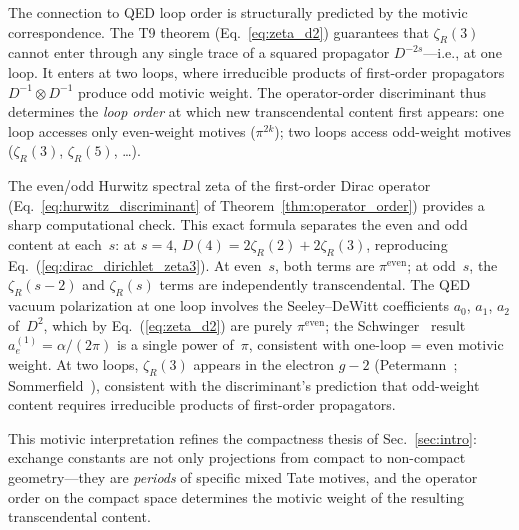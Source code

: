 \documentclass[aps,pra,twocolumn,superscriptaddress,longbibliography]{revtex4-2}
\begin{document}
The connection to QED loop order is structurally predicted by the
motivic correspondence.  The T9 theorem
(Eq.~\ref{eq:zeta_d2}) guarantees that $\zeta_R(3)$ cannot enter through
any single trace of a squared propagator $D^{-2s}$---i.e., at one loop.
It enters at two loops, where irreducible products of first-order
propagators $D^{-1} \otimes D^{-1}$ produce odd motivic weight.  The
operator-order discriminant thus determines the \emph{loop order} at
which new transcendental content first appears: one loop accesses only
even-weight motives ($\pi^{2k}$); two loops access odd-weight motives
($\zeta_R(3)$, $\zeta_R(5)$, \ldots).

The even/odd Hurwitz spectral zeta of the first-order Dirac operator
(Eq.~\ref{eq:hurwitz_discriminant} of Theorem~\ref{thm:operator_order})
provides a sharp computational check.
This exact formula separates the even and odd content at each~$s$:
at $s = 4$, $D(4) = 2\zeta_R(2) + 2\zeta_R(3)$, reproducing
Eq.~(\ref{eq:dirac_dirichlet_zeta3}).  At even~$s$, both terms are
$\pi^{\text{even}}$; at odd~$s$, the $\zeta_R(s{-}2)$ and
$\zeta_R(s)$ terms are independently transcendental.  The QED vacuum
polarization at one loop involves the Seeley--DeWitt coefficients
$a_0$, $a_1$, $a_2$ of~$D^2$, which by
Eq.~(\ref{eq:zeta_d2}) are purely $\pi^{\text{even}}$; the
Schwinger~\cite{schwinger1948} result $a_e^{(1)} = \alpha/(2\pi)$
is a single power of~$\pi$, consistent with one-loop = even motivic
weight.  At two loops, $\zeta_R(3)$ appears in the electron $g{-}2$
(Petermann~\cite{petermann1957}; Sommerfield~\cite{sommerfield1957}), consistent with
the discriminant's prediction that odd-weight content requires
irreducible products of first-order propagators.

This motivic interpretation refines the compactness thesis of
Sec.~\ref{sec:intro}: exchange constants are not only projections from
compact to non-compact geometry---they are \emph{periods} of specific
mixed Tate motives, and the operator order on the compact space
determines the motivic weight of the resulting transcendental content.
\end{document}
